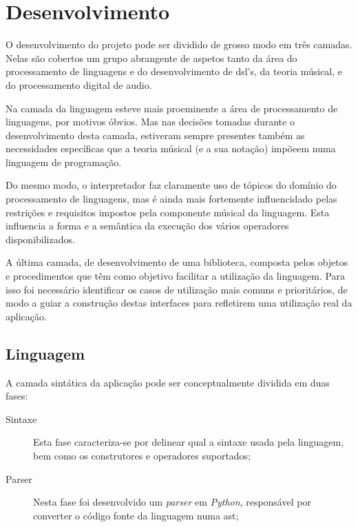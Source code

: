 \chapter{Desenvolvimento}
O desenvolvimento do projeto pode ser dividido de grosso modo em três camadas. Nelas são cobertos um grupo abrangente de aspetos tanto da área do processamento de linguagens e do desenvolvimento de \acrshort{dsl}'s, da teoria músical, e do processamento digital de audio. 

Na camada da linguagem esteve mais proeminente a área de processamento de linguagens, por motivos óbvios. Mas nas decisões tomadas durante o desenvolvimento desta camada, estiveram sempre presentes também as necessidades específicas que a teoria músical (e a sua notação) impõeem numa linguagem de programação.

Do mesmo modo, o interpretador faz claramente uso de tópicos do domínio do processamento de linguagens, mas é ainda mais fortemente influencidado pelas restrições  e requisitos impostos pela componente músical da linguagem. Esta influencia a forma e a semântica da execução dos vários operadores disponibilizados.

A última camada, de desenvolvimento de uma biblioteca, composta pelos objetos e procedimentos que têm como objetivo facilitar a utilização da linguagem. Para isso foi necessário identificar os casos de utilização mais comuns e prioritários, de modo a guiar a construção destas interfaces para refletirem uma utilização real da aplicação.

\section{Linguagem}
A camada sintática da aplicação pode ser conceptualmente dividida em duas fases:
\begin{description}
    \item[Sintaxe] Esta fase caracteriza-se por delinear qual a sintaxe usada pela linguagem, bem como os construtores e operadores suportados;
    \item[Parser] Nesta fase foi desenvolvido um \textit{parser} em \textit{Python}, responsável por converter o código fonte da linguagem numa \acrfull{ast};
\end{description}

